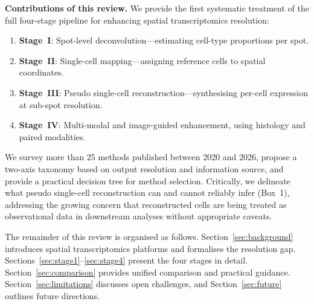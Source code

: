 \textbf{Contributions of this review.} We provide the first systematic treatment of the full four-stage pipeline for enhancing spatial transcriptomics resolution:
\begin{enumerate}
  \item \textbf{Stage~I}: Spot-level deconvolution---estimating cell-type proportions per spot.
  \item \textbf{Stage~II}: Single-cell mapping---assigning reference cells to spatial coordinates.
  \item \textbf{Stage~III}: Pseudo single-cell reconstruction---synthesising per-cell expression at sub-spot resolution.
  \item \textbf{Stage~IV}: Multi-modal and image-guided enhancement, using histology and paired modalities.
\end{enumerate}

We survey more than 25 methods published between 2020 and 2026, propose a two-axis taxonomy based on output resolution and information source, and provide a practical decision tree for method selection. Critically, we delineate what pseudo single-cell reconstruction can and cannot reliably infer (Box~1), addressing the growing concern that reconstructed cells are being treated as observational data in downstream analyses without appropriate caveats.

The remainder of this review is organised as follows. Section~\ref{sec:background} introduces spatial transcriptomics platforms and formalises the resolution gap. Sections~\ref{sec:stage1}--\ref{sec:stage4} present the four stages in detail. Section~\ref{sec:comparison} provides unified comparison and practical guidance. Section~\ref{sec:limitations} discusses open challenges, and Section~\ref{sec:future} outlines future directions.
